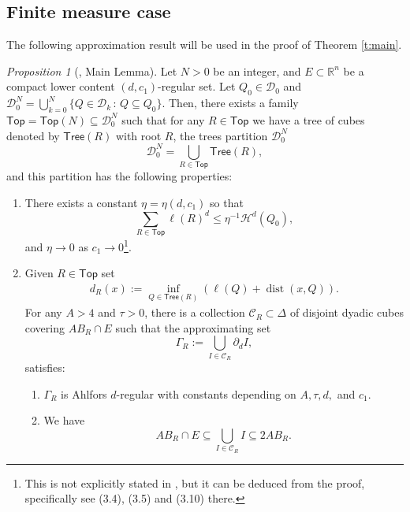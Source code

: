 \documentclass[11pt,reqno]{amsart}
\newcommand{\Top}{\mathsf{Top}}
\newcommand{\Stop}{\mathsf{Stop}}
\def\cC{{\mathscr{C}}}
\newcommand{\Tree}{\mathsf{Tree}}
\renewcommand{\d}{{\partial}}
\def\dist{\mathop\mathrm{dist}} 						%
\newcommand{\ps}[1]{\left( #1 \right)}
\theoremstyle{definition}
\theoremstyle{remark}
\numberwithin{equation}{section}
\newcommand{\R}{\mathbb{R}}
\newcommand{\dD}{\mathcal{D}}
\newcommand{\dH}{\mathcal{H}}
\theoremstyle{theorem}
\newtheorem{propo}[theorem]{Proposition}
\theoremstyle{definition}
\theoremstyle{remark}
\numberwithin{equation}{section}
\begin{document}
\subsection{Finite measure case} \label{s:ER}    
	 The following approximation result will be used in the proof of Theorem \ref{t:main}.
	\begin{propo}[\cite{azzam2019quantitative}, Main Lemma] \label{l:corona}
		Let $N>0$ be an integer, and $E \subset\R^n$ be a compact lower content $(d, c_1)$-regular set. Let $Q_{0}\in \dD_{0}$ and $\dD_0^N=\bigcup_{k=0}^{N}\{Q\in \dD_{k}\, : \,Q\subseteq Q_0\}$. Then, there exists a family $\Top=\Top(N)\subseteq\dD_0^N$ such that for any $R \in \Top$ we have a tree of cubes denoted by $\Tree(R)$ with root $R$, the trees partition $\dD_0^N$
		\begin{equation*}
		\dD_0^N = \bigcup_{R\in\Top}\Tree(R),
		\end{equation*}
		and this partition has the following properties:
		\begin{enumerate}[leftmargin=0.8cm]
			\item There exists a constant $\eta=\eta(d, c_1)$ so that
			\begin{equation}
			\label{e:ADR-packing}
			\sum_{R \in \Top} \ell(R)^{d} \leq \eta^{-1} \dH^{d}(Q_0),
			\end{equation}
			and $\eta\to 0$ as $c_1 \to 0$\footnote{This is not explicitly stated in \cite{azzam2019quantitative}, but it can be deduced from the proof, specifically see (3.4), (3.5) and (3.10) there.}.
			\item Given $R\in \Top$ set
			\begin{align}\label{e:d_F}
			d_{R}(x) := \inf_{Q \in \Tree(R)} \ps{ \ell(Q) + \dist(x,Q)}.
			\end{align}
			For any $A>4$ and $\tau>0$, there is a collection $\cC_R \subset \Delta$ of disjoint dyadic cubes covering $AB_{R}\cap E$ such that the approximating set
			\[
			\Gamma_R:=\bigcup_{I\in \cC_R} \d_{d} I,\]
			satisfies:
			\begin{enumerate}[label=\textup{(}\alph*\textup{)}, leftmargin=0.8cm]
				\item $\Gamma_R$ is Ahlfors $d$-regular with constants depending on $A,\tau,d,$ and $c_1$.
				\item We have
				\begin{equation}
				\label{e:contains}
				AB_{R}\cap E \subseteq \bigcup_{I\in \cC_R} I\subseteq 2AB_{R}.
				\end{equation}
				

\end{enumerate}
\end{enumerate}
\end{propo}
\end{document}
